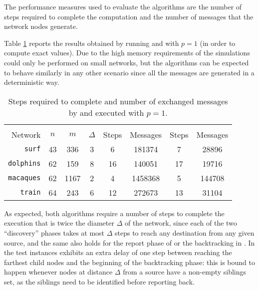 The performance measures used to evaluate the algorithms are the number of steps required to complete the computation and the number of messages that the network nodes generate.

Table \ref{table:comparison} reports the results obtained by running \deccen{} and \multibfs{} with $p = 1$ (in order to compute exact values). Due to the high memory requirements of \deccen{} the simulations could only be performed on small networks, but the algorithms can be expected to behave similarly in any other scenario since all the messages are generated in a deterministic way.

\begin{table}
\centering

\begin{tabular}{r c c c c c c c}
\toprule
 & & & & \multicolumn{2}{c}{\deccen{}} & \multicolumn{2}{c}{\multibfs{}} \\ \cmidrule(lr){5-6} \cmidrule(lr){7-8} 

Network           & $n$ & $m$  & $\Delta$ & Steps  & Messages & Steps & Messages \\ \midrule

\texttt{surf}     & 43  & 336  & 3        & 6      & 181374  & 7     & 28896 \\
\texttt{dolphins} & 62  & 159  & 8        & 16     & 140051   & 17    & 19716 \\
\texttt{macaques}  & 62  & 1167 & 2        & 4      & 1458368  & 5     & 144708 \\
\texttt{train}    & 64  & 243  & 6        & 12     & 272673  & 13    & 31104 \\
 
\bottomrule

\end{tabular}

\caption{Steps required to complete and number of exchanged messages by \deccen{} and \multibfs{} executed with $p=1$.}

\label{table:comparison}

\end{table}

As expected, both algorithms require a number of steps to complete the execution that is twice the diameter $\Delta$ of the network, since each of the two ``discovery'' phases takes at most $\Delta$ steps to reach any destination from any given source, and the same also holds for the report phase of \deccen{} or the backtracking in \multibfs{}. In the test instances \multibfs{} exhibits an extra delay of one step between reaching the farthest child nodes and the beginning of the backtracking phase: this is bound to happen whenever nodes at distance $\Delta$ from a source have a non-empty siblings set, as the siblings need to be identified before reporting back.

